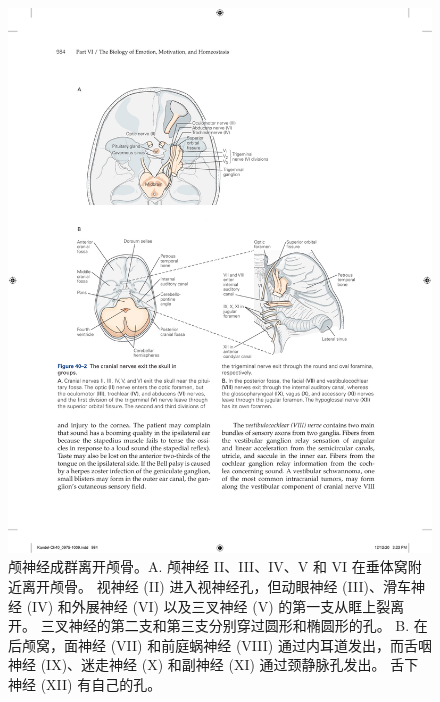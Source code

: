 \begin{figure}[htbp]
	\centering
	\includegraphics[width=0.85\linewidth]{chap40/fig_40_2}
	\caption{颅神经成群离开颅骨。A. 颅神经 II、III、IV、V 和 VI 在垂体窝附近离开颅骨。 视神经 (II) 进入视神经孔，但动眼神经 (III)、滑车神经 (IV) 和外展神经 (VI) 以及三叉神经 (V) 的第一支从眶上裂离开。 三叉神经的第二支和第三支分别穿过圆形和椭圆形的孔。 B. 在后颅窝，面神经 (VII) 和前庭蜗神经 (VIII) 通过内耳道发出，而舌咽神经 (IX)、迷走神经 (X) 和副神经 (XI) 通过颈静脉孔发出。 舌下神经 (XII) 有自己的孔。}
	\label{fig:40_2}
\end{figure}



